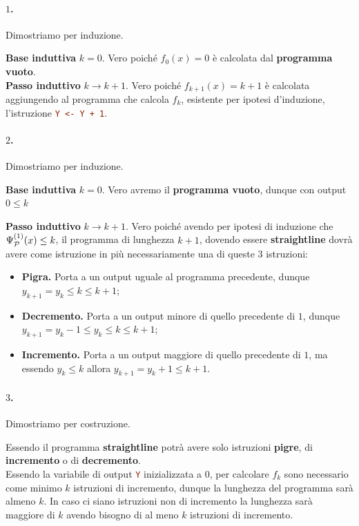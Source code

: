 \paragraph*{\(1\).} Dimostriamo per induzione.\label{Esercizio f_k(x)=k}

\textbf{Base induttiva} \(k=0\). Vero poiché \(f_0(x)=0\) è calcolata dal \textbf{programma vuoto}. \\
\textbf{Passo induttivo} \(k\to k+1\). Vero poiché \(f_{k+1}(x)=k+1\) è calcolata aggiungendo al programma che calcola \(f_k\), esistente per ipotesi d'induzione, l'istruzione \lstinline[language=ini]{Y <- Y + 1}.

\paragraph*{\(2\).} Dimostriamo per induzione.\label{Esercizio Straightline P lunghezza <= k}

\textbf{Base induttiva} \(k=0\). Vero avremo il \textbf{programma vuoto}, dunque con output \(0\leq k\)

\textbf{Passo induttivo} \(k\to k+1\). Vero poiché avendo per ipotesi di induzione che \(\Psi_{\mathcal{P}}^{(1)}(x)\leq k\), il programma di lunghezza \(k+1\), dovendo essere \textbf{straightline} dovrà avere come istruzione in più necessariamente una di queste \(3\) istruzioni:
\begin{itemize}
    \item \textbf{Pigra.} Porta a un output uguale al programma precedente, dunque \(y_{k+1}=y_k\leq k \leq k+1\);
    \item \textbf{Decremento.} Porta a un output minore di quello precedente di \(1\), dunque \(y_{k+1}=y_k-1\leq y_k \leq k \leq k+1\);
    \item \textbf{Incremento.} Porta a un output maggiore di quello precedente di \(1\), ma essendo \(y_k\leq k\) allora \(y_{k+1}=y_k+1\leq k+1\).
\end{itemize}

\paragraph*{\(3\).} Dimostriamo per costruzione.\label{Esercizio Straightline P lunghezza > k}

Essendo il programma \textbf{straightline} potrà avere solo istruzioni \textbf{pigre}, di \textbf{incremento} o di \textbf{decremento}. \\
Essendo la variabile di output \lstinline[language=ini]{Y} inizializzata a \(0\), per calcolare \(f_k\) sono necessario come minimo \(k\) istruzioni di incremento, dunque la lunghezza del programma sarà almeno \(k\).
In caso ci siano istruzioni non di incremento la lunghezza sarà maggiore di \(k\) avendo bisogno di al meno \(k\) istruzioni di incremento.

